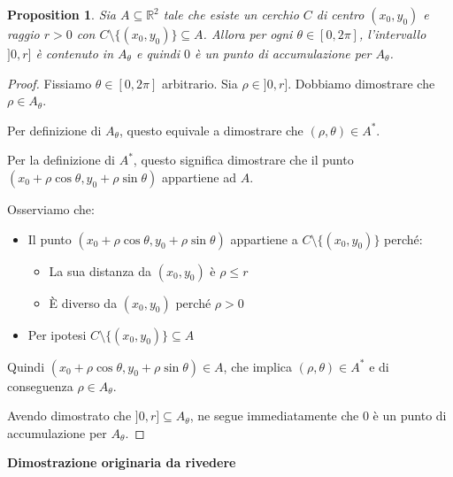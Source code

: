 \documentclass{article}
\theoremstyle{plain}
\newtheorem{prop}[thm]{Proposition}
\theoremstyle{definition}
\theoremstyle{remark}
\begin{document}
\begin{bxthm}
\begin{prop}
    Sia $A\subseteq\mathbb{R}^2$ tale che esiste un cerchio $C$ di centro $(x_0,y_0)$ e raggio $r>0$ con $C\setminus\{(x_0,y_0)\}\subseteq A$. 
    Allora per ogni $\theta\in[0,2\pi]$, l'intervallo $]0,r]$ è contenuto in $A_\theta$ e quindi $0$ è un punto di accumulazione per $A_\theta$.
\end{prop}
\end{bxthm}
\begin{proof}
    Fissiamo $\theta\in[0,2\pi]$ arbitrario. 
    Sia $\rho\in]0,r]$. Dobbiamo dimostrare che $\rho\in A_\theta$.
    
    Per definizione di $A_\theta$, questo equivale a dimostrare che $(\rho,\theta)\in A^*$.
    
    Per la definizione di $A^*$, questo significa dimostrare che il punto $(x_0+\rho\cos\theta,y_0+\rho\sin\theta)$ appartiene ad $A$.

    Osserviamo che:
    \begin{itemize}
        \item Il punto $(x_0+\rho\cos\theta,y_0+\rho\sin\theta)$ appartiene a $C\setminus\{(x_0,y_0)\}$ perché:
        \begin{itemize}
            \item La sua distanza da $(x_0,y_0)$ è $\rho\leq r$
            \item È diverso da $(x_0,y_0)$ perché $\rho>0$
        \end{itemize}
        \item Per ipotesi $C\setminus\{(x_0,y_0)\}\subseteq A$
    \end{itemize}

    Quindi $(x_0+\rho\cos\theta,y_0+\rho\sin\theta)\in A$, che implica $(\rho,\theta)\in A^*$ e di conseguenza $\rho\in A_\theta$.

    Avendo dimostrato che $]0,r]\subseteq A_\theta$, ne segue immediatamente che $0$ è un punto di accumulazione per $A_\theta$.
\end{proof}
\textbf{Dimostrazione originaria da rivedere}
\end{document}
